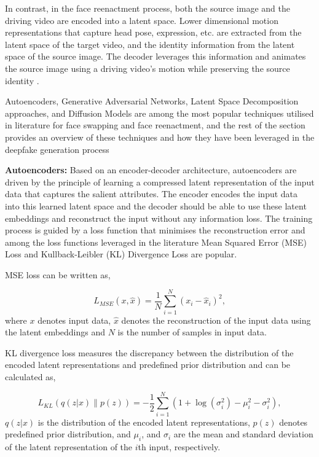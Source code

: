 In contrast, in the face reenactment process, both the source image and the driving video are encoded into a latent space. Lower dimensional motion representations that capture head pose, expression, etc. are extracted from the latent space of the target video, and the identity information from the latent space of the source image. The decoder leverages this information and animates the source image using a driving video’s motion while preserving the source identity \cite{agarwal2023audio}.  
 
Autoencoders, Generative Adversarial Networks, Latent Space Decomposition approaches, and Diffusion Models are among the most popular techniques utilised in literature for face swapping and face reenactment, and the rest of the section provides an overview of these techniques and how they have been leveraged in the deepfake generation process

\textbf{Autoencoders: } Based on an encoder-decoder architecture, autoencoders are driven by the principle of learning a compressed latent representation of the input data that captures the salient attributes. The encoder encodes the input data into this learned latent space and the decoder should be able to use these latent embeddings and reconstruct the input without any information loss. The training process is guided by a loss function that minimises the reconstruction error and among the loss functions leveraged in the literature Mean Squared Error (MSE) Loss and Kullback-Leibler (KL) Divergence Loss are popular.

MSE loss can be written as,

\begin{equation}
    L_{MSE}(x, \hat{x}) = \frac{1}{N} \sum_{i=1}^{N} (x_i - \hat{x}_i)^2,
\end{equation}
where $x$ denotes input data, $\hat{x}$ denotes the reconstruction of the input data using the latent embeddings and $N$ is the number of samples in input data.

KL divergence loss measures the discrepancy between the distribution of the encoded latent representations and  predefined prior distribution and can be calculated as,

\begin{equation}
L_{KL}(q(z|x) \| p(z)) = -\frac{1}{2} \sum_{i=1}^{N} \left(1 + \log(\sigma_i^2) - \mu_i^2 - \sigma_i^2\right),
\end{equation}
$q(z|x)$ is the distribution of the encoded latent representations, $p(z)$ denotes predefined prior distribution, and $\mu_i$, and $\sigma_i$ are the mean and standard deviation of the latent representation of the $i$th input, respectively.

